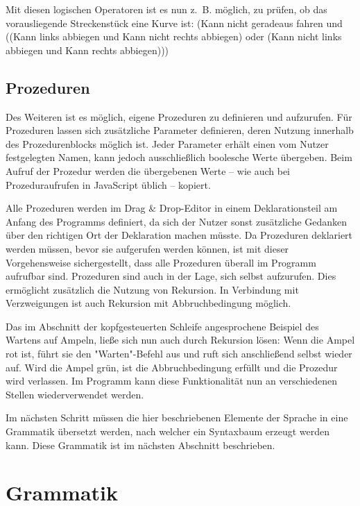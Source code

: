 Mit diesen logischen Operatoren ist es nun z.~B. möglich, zu prüfen, ob das vorausliegende Streckenstück eine Kurve ist: (Kann nicht geradeaus fahren und ((Kann links abbiegen und Kann nicht rechts abbiegen) oder (Kann nicht links abbiegen und Kann rechts abbiegen)))

\subsection*{Prozeduren}
\label{sec:implementation:elements:proc}

Des Weiteren ist es möglich, eigene Prozeduren zu definieren und aufzurufen. Für Prozeduren lassen sich zusätzliche Parameter definieren, deren Nutzung innerhalb des Prozedurenblocks möglich ist. Jeder Parameter erhält einen vom Nutzer festgelegten Namen, kann jedoch ausschließlich boolesche Werte übergeben. Beim Aufruf der Prozedur werden die übergebenen Werte -- wie auch bei Prozeduraufrufen in JavaScript üblich -- kopiert.

Alle Prozeduren werden im Drag \& Drop-Editor in einem Deklarationsteil am Anfang des Programms definiert, da sich der Nutzer sonst zusätzliche Gedanken über den richtigen Ort der Deklaration machen müsste. Da Prozeduren deklariert werden müssen, bevor sie aufgerufen werden können, ist mit dieser Vorgehensweise sichergestellt, dass alle Prozeduren überall im Programm aufrufbar sind. Prozeduren sind auch in der Lage, sich selbst aufzurufen. Dies ermöglicht zusätzlich die Nutzung von Rekursion. In Verbindung mit Verzweigungen ist auch Rekursion mit Abbruchbedingung möglich.

Das im Abschnitt der kopfgesteuerten Schleife angesprochene Beispiel des Wartens auf Ampeln, ließe sich nun auch durch Rekursion lösen: Wenn die Ampel rot ist, führt sie den "Warten"-Befehl aus und ruft sich anschließend selbst wieder auf. Wird die Ampel grün, ist die Abbruchbedingung erfüllt und die Prozedur wird verlassen. Im Programm kann diese Funktionalität nun an verschiedenen Stellen wiederverwendet werden.

Im nächsten Schritt müssen die hier beschriebenen Elemente der Sprache in eine Grammatik übersetzt werden, nach welcher ein Syntaxbaum erzeugt werden kann. Diese Grammatik ist im nächsten Abschnitt beschrieben.

\section{Grammatik}
\label{sec:implementation:grammar}

